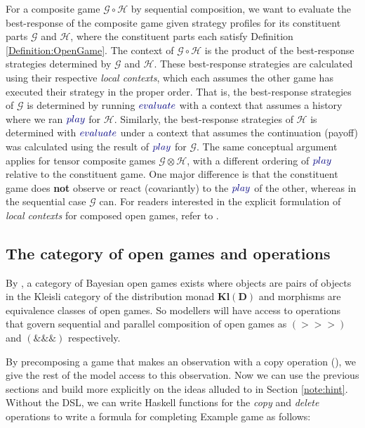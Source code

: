 \documentclass[11pt,titlepage,dvipsnames,table,xcdraw,english]{article}
\newcommand{\Varid}[1]{\mathit{#1}}
\renewcommand{\Varid}[1]{{\color{typeColor}{#1}}}
\begin{document}
For a composite game $\mathcal{G} \circ \mathcal{H}$ by sequential composition, we want to evaluate the best-response of the composite game given strategy profiles for its constituent parts $\mathcal{G}$ and $\mathcal{H}$, where the constituent parts each satisfy Definition \ref{Definition:OpenGame}. The context of $\mathcal{G} \circ \mathcal{H}$ is the product of the best-response strategies determined by $\mathcal{G}$ and $\mathcal{H}$. These best-response strategies are calculated using their respective \textit{local contexts}, which each assumes the other game has executed their strategy in the proper order. That is, the best-response strategies of $\mathcal{G}$ is determined by running \ensuremath{\Varid{evaluate}} with a context that assumes a history where we ran \ensuremath{\Varid{play}} for $\mathcal{H}$. Similarly, the best-response strategies of $\mathcal{H}$ is determined with \ensuremath{\Varid{evaluate}} under a context that assumes the continuation (payoff) was calculated using the result of \ensuremath{\Varid{play}} for $\mathcal{G}$. The same conceptual argument applies for tensor composite games $\mathcal{G} \otimes \mathcal{H}$, with a different ordering of \ensuremath{\Varid{play}} relative to the constituent game. One major difference is that the constituent game does \textbf{not} observe or react (covariantly) to the \ensuremath{\Varid{play}} of the other, whereas in the sequential case $\mathcal{G}$ can. For readers interested in the explicit formulation of \textit{local contexts} for composed open games, refer to \cite[Section 3.7]{BayesianOpenGames}. 




\subsection{The category of open games and operations}

By \cite[Theorem 3.10.2]{BayesianOpenGames}, a category of Bayesian open games exists where objects are pairs 
of objects in the Kleisli category of the distribution monad $\mathbf{Kl}(\textbf{D})$ and morphisms are equivalence classes of open games. So modellers will have access to operations that govern sequential and parallel composition of open games as \ensuremath{(\mathbin{>>>})} and \ensuremath{(\mathbin{\&\&\&})} respectively. 

By precomposing a game that makes an observation with a copy operation (\cite[Definition 4.4.3]{BayesianOpenGames}), we give the rest of the model access to this observation. Now we can use the previous sections and build more explicitly on the ideas alluded to in Section \ref{note:hint}.
Without the DSL, we can write Haskell functions for the \textit{copy} and \textit{delete} operations to write a formula for completing Example \hyperref[example:nature] game as follows: 
\end{document}
